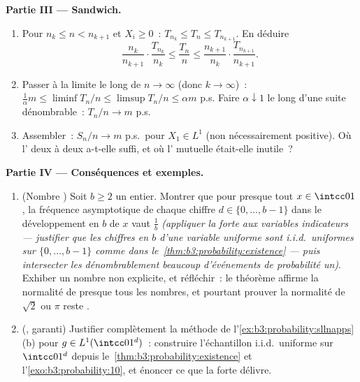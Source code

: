 \begin{problem}
\medskip
\noindent\textbf{Partie III --- Sandwich.}
\begin{enumerate}[resume]
  \item Pour $n_k \leq n < n_{k+1}$ et $X_i \geq 0$~:
        $T_{n_k} \leq T_n \leq T_{n_{k+1}}$. En déduire
        \[
        \frac{n_k}{n_{k+1}}\cdot\frac{T_{n_k}}{n_k} \leq
        \frac{T_n}{n} \leq \frac{n_{k+1}}{n_k}\cdot
        \frac{T_{n_{k+1}}}{n_{k+1}} .
        \]
  \item Passer à la limite le long de $n \to \infty$ (donc
        $k \to \infty$)~: $\frac1\alpha m \leq \liminf
        T_n/n \leq \limsup T_n/n \leq \alpha m$ p.s. Faire
        $\alpha \downarrow 1$ le long d'une suite
        dénombrable~: $T_n/n \to m$ p.s.
  \item Assembler~: $S_n/n \to m$ p.s.\ pour $X_1 \in L^1$
        (non nécessairement positive). Où l'
        deux à deux a-t-elle suffi, et où l'
        mutuelle était-elle inutile~?
\end{enumerate}

\medskip
\noindent\textbf{Partie IV --- Conséquences et exemples.}
\begin{enumerate}[resume]
  \item (Nombre ) Soit $b \geq 2$ un entier. Montrer
        que pour presque tout $x \in \intcc01$, la
        fréquence asymptotique de chaque chiffre $d \in
        \{0,\dots,b-1\}$ dans le développement en  $b$
        de $x$ vaut $\frac1b$ \emph{(appliquer la 
        forte aux variables indicateurs --- justifier que
        les chiffres en  $b$ d'une variable uniforme
        sont i.i.d.\ uniformes sur $\{0,\dots,b-1\}$ comme
        dans le~\cref{thm:b3:probability:existence} ---
        puis intersecter les dénombrablement beaucoup
        d'événements de probabilité un)}. Exhiber un
        nombre non  explicite, et réfléchir~: le
        théorème affirme la normalité de presque tous les
        nombres, et pourtant prouver la normalité de
        $\sqrt2$ ou $\pi$ reste .
  \item (, garanti) Justifier complètement la
        méthode de l'\cref{ex:b3:probability:sllnapps}(b)
        pour $g \in L^1(\intcc01^d)$~: construire
        l'échantillon i.i.d.\ uniforme sur $\intcc01^d$
        depuis le~\cref{thm:b3:probability:existence} et
        l'\cref{exo:b3:probability:10}, et énoncer ce que
        la  forte délivre.
\end{enumerate}


\end{problem}
